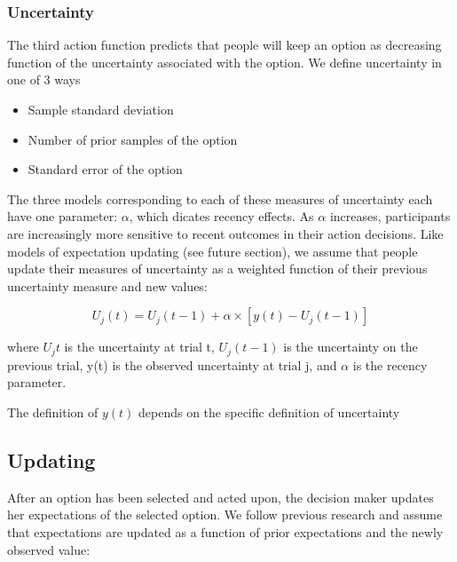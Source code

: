 \documentclass[a4paper,doc,natbib,floatsintext]{apa6}\usepackage[]{graphicx}\usepackage[]{color}
\begin{document}
\subsubsection{Uncertainty}

The third action function predicts that people will keep an option as decreasing function of the uncertainty associated with the option. We define uncertainty in one of 3 ways

\begin{itemize}
  \item Sample standard deviation
  \item Number of prior samples of the option
  \item Standard error of the option
\end{itemize}

The three models corresponding to each of these measures of uncertainty each have one parameter: $\alpha$, which dicates recency effects. As $\alpha$ increases, participants are increasingly more sensitive to recent outcomes in their action decisions. Like models of expectation updating (see future section), we assume that people update their measures of uncertainty as a weighted function of their previous uncertainty measure and new values:

\begin{center}
\begin{equation}
\label{eq:uncertaintyupdatingmodels}

U_{j}(t)=U_{j}(t-1)+\alpha \times [y(t) - U_{j}(t-1)]

\end{equation}
\end{center}

where $U_{j}{t}$ is the uncertainty at trial t, $U_{j}(t-1)$ is the uncertainty on the previous trial, y(t) is the observed uncertainty at trial j, and $\alpha$ is the recency parameter.

The definition of $y(t)$ depends on the specific definition of uncertainty


\subsection{Updating}

After an option has been selected and acted upon, the decision maker updates her expectations of the selected option. We follow previous research \citep{yechiam2005models} and assume that expectations are updated as a function of prior expectations and the newly observed value:
\end{document}
